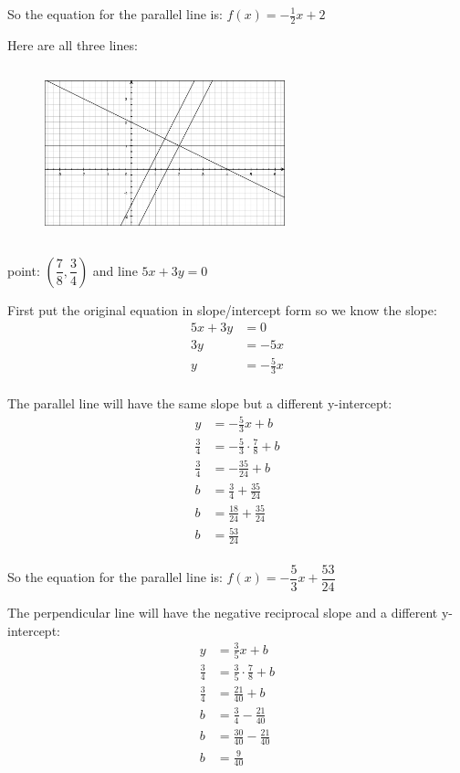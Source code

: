 \documentclass[fleqn,addpoints]{exam}
\begin{document}
\begin{questions}
\begin{parts}
\begin{solution}[1cm]
So the equation for the parallel line is: $f(x) = - \frac{1}{2}x + 2$

Here are all three lines:
\begin{figure}[H]
  \includegraphics[width=7cm,height=5cm]{linear-1}
\end{figure}

\end{solution}

\end{parts}

\question
point: $\left( \dfrac{7}{8}, \dfrac{3}{4} \right)$ and line $5x + 3y = 0$

\begin{solution}[1cm]
First put the original equation in slope/intercept form so we know the slope:
\begin{align*}
  5x + 3y &= 0 \\
  3y &= -5x \\
  y &= -\frac{5}{3} x \\
\end{align*}

The parallel line will have the same slope but a different y-intercept:
\begin{align*}
  y &= -\frac{5}{3} x + b \\
  \frac{3}{4} &= -\frac{5}{3} \cdot \frac{7}{8} + b \\
  \frac{3}{4} &= -\frac{35}{24}  + b \\
  b &= \frac{3}{4} + \frac{35}{24} \\
  b &= \frac{18}{24} + \frac{35}{24} \\
  b &= \frac{53}{24} \\
\end{align*}

So the equation for the parallel line is: $f(x) = -\dfrac{5}{3} x + \dfrac{53}{24}$

The perpendicular line will have the negative reciprocal slope and a different y-intercept:
\begin{align*}
  y &= \frac{3}{5}x + b \\
  \frac{3}{4} &= \frac{3}{5} \cdot \frac{7}{8} + b \\
  \frac{3}{4} &= \frac{21}{40} + b \\
  b &= \frac{3}{4} - \frac{21}{40} \\
  b &= \frac{30}{40} - \frac{21}{40} \\
  b &= \frac{9}{40} \\
\end{align*}


\end{solution}
\end{questions}
\end{document}
